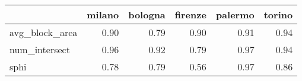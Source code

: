 \begin{tabular}{lrrrrr}
\toprule
{} &  milano &  bologna &  firenze &  palermo &  torino \\
\midrule
avg\_block\_area &    0.90 &     0.79 &     0.90 &     0.91 &    0.94 \\
num\_intersect  &    0.96 &     0.92 &     0.79 &     0.97 &    0.94 \\
sphi           &    0.78 &     0.79 &     0.56 &     0.97 &    0.86 \\
\bottomrule
\end{tabular}
